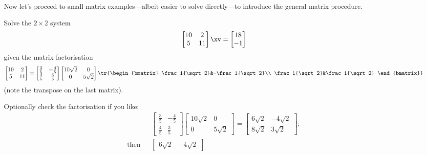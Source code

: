 Now let's proceed to small matrix examples---albeit easier to solve directly---to  introduce the general matrix procedure.
\begin{example} \label{eg:2by2svd}
Solve the \(2\times2\) system
\begin{equation*}
\begin{bmatrix} 10&2\\5&11 \end{bmatrix}\xv
=\begin{bmatrix} 18\\-1 \end{bmatrix}
\end{equation*}
given the matrix factorisation
\begin{equation*}
\begin{bmatrix} 10&2\\5&11 \end{bmatrix}=
\begin{bmatrix} \frac35&-\frac45\\\frac45&\frac35 \end{bmatrix}
\begin{bmatrix} 10\sqrt2&0\\0&5\sqrt2 \end{bmatrix}
\tr{\begin{bmatrix} \frac1{\sqrt2}&-\frac1{\sqrt2}\\ \frac1{\sqrt2}&\frac1{\sqrt2} \end{bmatrix}}
\end{equation*}
(note the transpose on the last matrix).
\begin{solution} 
Optionally check the factorisation if you like:
\begin{eqnarray*}&&
\begin{bmatrix} \frac35&-\frac45\\\frac45&\frac35 \end{bmatrix}
\begin{bmatrix} 10\sqrt2&0\\0&5\sqrt2 \end{bmatrix}
=\begin{bmatrix} 6{\sqrt2}& -4{\sqrt2}
\\ 8{\sqrt2}&3{\sqrt2} \end{bmatrix};
\\\text{then}&&
\begin{bmatrix} 6{\sqrt2}& -4{\sqrt2}

\end{bmatrix}
\end{eqnarray*}
\end{solution}
\end{example}
